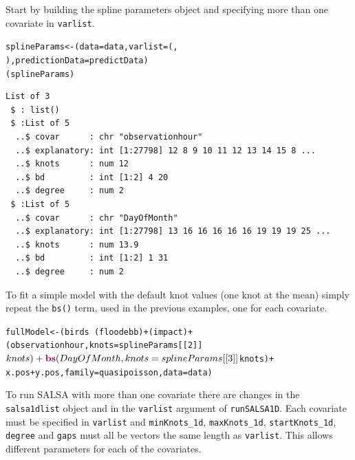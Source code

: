 \noindent Start by building the spline parameters object and specifying more than one covariate in {\tt varlist}.
\begin{knitrout}\footnotesize
{}\color{fgcolor}\begin{kframe}
\begin{alltt}
splineParams<-(data=data, varlist=(,
    ), predictionData=predictData)
(splineParams)
\begin{verbatim}
List of 3
 $ : list()
 $ :List of 5
  ..$ covar      : chr "observationhour"
  ..$ explanatory: int [1:27798] 12 8 9 10 11 12 13 14 15 8 ...
  ..$ knots      : num 12
  ..$ bd         : int [1:2] 4 20
  ..$ degree     : num 2
 $ :List of 5
  ..$ covar      : chr "DayOfMonth"
  ..$ explanatory: int [1:27798] 13 16 16 16 16 16 19 19 19 25 ...
  ..$ knots      : num 13.9
  ..$ bd         : int [1:2] 1 31
  ..$ degree     : num 2
\end{verbatim}
\end{alltt}
\end{kframe}
\end{knitrout}

\noindent To fit a simple model with the default knot values (one knot at the mean) simply repeat the {\tt bs()} term, used in the previous examples, one for each covariate.

\begin{knitrout}\footnotesize
{}\color{fgcolor}\begin{kframe}
\begin{alltt}
fullModel<-(birds ~ (floodebb) + (impact) + 
    (observationhour, knots=splineParams[[2]]$knots) + 
    \hlfunctioncall{bs}(DayOfMonth, knots=splineParams[[3]]$knots) + 
    x.pos + y.pos, family=quasipoisson, data=data)
\end{alltt}
\end{kframe}
\end{knitrout}

\noindent To run SALSA with more than one covariate there are changes in the {\tt salsa1dlist} object and in the {\tt varlist} argument of {\tt runSALSA1D}.  Each covariate must be specified in {\tt varlist} and {\tt minKnots\_1d}, {\tt maxKnots\_1d}, {\tt startKnots\_1d}, {\tt degree} and {\tt gaps} must all be vectors the same length as {\tt varlist}.  This allows different parameters for each of the covariates.\\

